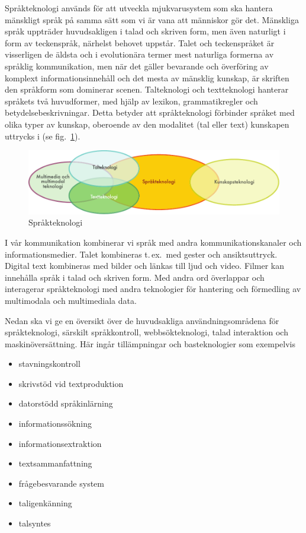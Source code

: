 \begin{multicols}{2}

Språkteknologi används för att utveckla mjukvarusystem som ska hantera
mänskligt språk på samma sätt som vi är vana att människor gör
det. Mänskliga språk uppträder huvudsakligen i talad och skriven form,
men även naturligt i form av teckenspråk, närhelst behovet
uppstår. Talet och teckenspråket är visserligen de äldsta och i
evolutionära termer mest naturliga formerna av språklig kommunikation,
men när det gäller bevarande och överföring av komplext
informationsinnehåll och det mesta av mänsklig kunskap, är skriften
den språkform som dominerar scenen. Talteknologi och textteknologi
hanterar språkets två huvudformer, med hjälp av lexikon,
grammatikregler och betydelsebeskrivningar. Detta betyder att
språkteknologi förbinder språket med olika typer av kunskap, oberoende
av den modalitet (tal eller text) kunskapen uttrycks i (se fig.~\ref{fig:ltincontext_sv}).

\begin{figure}[htb]
  \center
  \includegraphics[width=\textwidth]{../_media/swedish/language_technologies}
  \caption{Språkteknologi}
  \label{fig:ltincontext_sv}
\end{figure}

I vår kommunikation kombinerar vi språk med andra
kommunikationskanaler och informationsmedier. Talet kombineras
t.\,ex.~med gester och ansiktsuttryck. Digital text kombineras med
bilder och länkas till ljud och video. Filmer kan innehålla språk i
talad och skriven form. Med andra ord överlappar och interagerar
språkteknologi med andra teknologier för hantering och förmedling av
multimodala och multimediala data.

Nedan ska vi ge en översikt över de huvudsakliga användningsområdena
för språkteknologi, särskilt språkkontroll, webbsökteknologi, talad
interaktion och maskin\-över\-sätt\-ning. Här ingår tillämpningar och
basteknologier som exempelvis

\begin{itemize}
\item stavningskontroll
\item skrivstöd vid textproduktion
\item datorstödd språkinlärning
\item informationssökning
\item informationsextraktion
\item textsammanfattning
\item frågebesvarande system
\item taligenkänning
\item talsyntes
\end{itemize}


\end{multicols}
